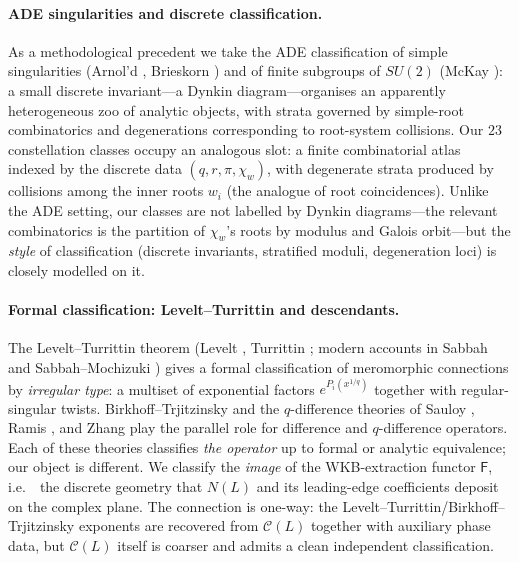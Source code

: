 \documentclass[11pt,a4paper]{article}
\theoremstyle{plain}
\theoremstyle{definition}
\theoremstyle{remark}
\newcommand{\NL}{N(L)}
\newcommand{\Cl}{\mathcal{C}}
\newcommand{\Fclass}{\mathsf{F}}
\newcommand{\ie}{i.e.\ }
\begin{document}
\paragraph{ADE singularities and discrete classification.}
As a methodological precedent we take the ADE classification of simple
singularities (Arnol'd \cite{arnold1976}, Brieskorn \cite{brieskorn}) and
of finite subgroups of $SU(2)$ (McKay \cite{mckay}): a small discrete
invariant---a Dynkin diagram---organises an apparently heterogeneous zoo
of analytic objects, with strata governed by simple-root combinatorics
and degenerations corresponding to root-system collisions. Our $23$
constellation classes occupy an analogous slot: a finite combinatorial
atlas indexed by the discrete data $(q, r, \pi, \chi_w)$, with degenerate
strata produced by collisions among the inner roots $w_i$ (the analogue
of root coincidences). Unlike the ADE setting, our classes are not
labelled by Dynkin diagrams---the relevant combinatorics is the partition
of $\chi_w$'s roots by modulus and Galois orbit---but the \emph{style} of
classification (discrete invariants, stratified moduli, degeneration
loci) is closely modelled on it.

\paragraph{Formal classification: Levelt--Turrittin and descendants.}
The Levelt--Turrittin theorem (Levelt \cite{levelt}, Turrittin
\cite{turrittin}; modern accounts in Sabbah \cite{sabbah-isomon} and
Sabbah--Mochizuki \cite{mochizuki-asymptotic}) gives a formal
classification of meromorphic connections by \emph{irregular type}: a
multiset of exponential factors $e^{P_i(x^{1/q})}$ together with
regular-singular twists. Birkhoff--Trjitzinsky \cite{birkhoff-trjitzinsky}
and the $q$-difference theories of Sauloy \cite{sauloy}, Ramis
\cite{ramis-stokes,ramis-q-stokes}, and Zhang \cite{zhang} play the
parallel role for difference and $q$-difference operators. Each of these
theories classifies \emph{the operator} up to formal or analytic
equivalence; our object is different. We classify the \emph{image} of
the WKB-extraction functor $\Fclass$, \ie\ the discrete geometry that
$\NL$ and its leading-edge coefficients deposit on the complex plane.
The connection is one-way: the Levelt--Turrittin/Birkhoff--Trjitzinsky
exponents are recovered from $\Cl(L)$ together with auxiliary phase data,
but $\Cl(L)$ itself is coarser and admits a clean independent
classification.
\end{document}
